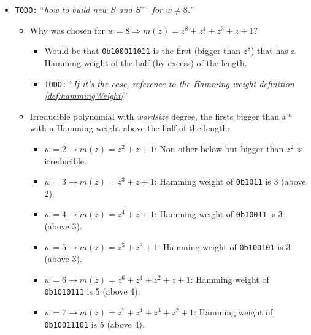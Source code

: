 \documentclass[10pt,a4paper,twoside]{llncs}
\newcommand{\todo}[1]{\texttt{\color{red}TODO:} ``\emph{#1}''}
\begin{document}
\begin{itemize}
 \item \todo{how to build new $S$ and $S^{-1}$ for $w\neq 8$.}
 \begin{itemize}
  \item Why was chosen for $w=8 \Rightarrow m(z) = z^8+z^4+z^3+z+1$?
  \begin{itemize}
   \item Would be that \texttt{0b100011011} is the first (bigger than $z^8$) that has a Hamming weight of the half (by excess) of the length.
   \item \todo{If it's the case, reference to the Hamming weight definition \ref{def:hammingWeight}}
  \end{itemize}
  \item Irreducible polynomial with \emph{wordsize} degree, the firsts bigger than $x^w$ with a Hamming weight above the half of the length:
  \begin{itemize}
   \item $w=2 \rightarrow m(z) = z^2+z+1$: Non other below but bigger than $z^2$ is irreducible.
   \item $w=3 \rightarrow m(z) = z^3+z+1$: Hamming weight of \texttt{0b1011} is 3 (above 2).
   \item $w=4 \rightarrow m(z) = z^4+z+1$: Hamming weight of \texttt{0b10011} is 3 (above 3).
   \item $w=5 \rightarrow m(z) = z^5+z^2+1$: Hamming weight of \texttt{0b100101} is 3 (above 3).
   \item $w=6 \rightarrow m(z) = z^6+z^4+z^2+z+1$: Hamming weight of \texttt{0b1010111} is 5 (above 4).
   \item $w=7 \rightarrow m(z) = z^7+z^4+z^3+z^2+1$: Hamming weight of \texttt{0b10011101} is 5 (above 4).

\end{itemize}
\end{itemize}
\end{itemize}
\end{document}
